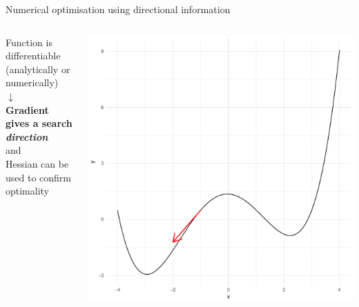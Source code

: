 \documentclass[16pt,aspectratio=169]{beamer}
\begin{document}
\begin{frame}{Numerical optimisation using directional information}
    \begin{columns}
        \begin{column}{0.5\textwidth}
            \centering
            Function is differentiable \\ (analytically or numerically) \\[1em]
            $\downarrow$ \\[1em]
            \textbf{Gradient gives a search \emph{direction}} \\
            and \\
            Hessian can be used to confirm optimality
        \end{column}
        \begin{column}{0.5\textwidth}
            \includegraphics[height=0.95\textheight]{figures/derivative}
        \end{column}
    \end{columns}
\end{frame}
\end{document}
